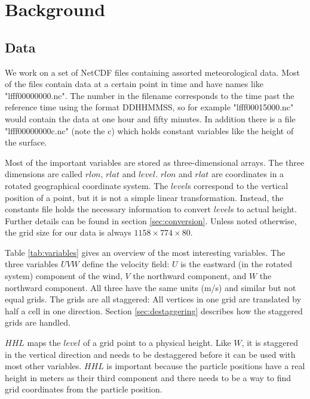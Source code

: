 \setcounter{chapter}{1}

\chapter{Background}
\section{Data}\label{sec:data}
We work on a set of NetCDF files containing assorted meteorological data. Most of the files contain data at a certain point in time and have names like "lfff00000000.nc". The number in the filename corresponds to the time past the reference time using the format DDHHMMSS, so for example "lfff00015000.nc" would contain the data at one hour and fifty minutes. In addition there is a file "lfff00000000c.nc" (note the c) which holds constant variables like the height of the surface.

Most of the important variables are stored as three-dimensional arrays. The three dimensions are called $rlon$, $rlat$ and $level$. $rlon$ and $rlat$ are coordinates in a rotated geographical coordinate system. The $level$s correspond to the vertical position of a point, but it is not a simple linear transformation. Instead, the constants file holds the necessary information to convert $level$s to actual height. Further details can be found in section \ref{sec:conversion}. Unless noted otherwise, the grid size for our data is always $1158 \times 774 \times 80$.

Table \ref{tab:variables} gives an overview of the most interesting variables. The three variables $UVW$ define the velocity field: $U$ is the eastward (in the rotated system) component of the wind, $V$ the northward component, and $W$ the northward component. All three have the same units (m/s) and similar but not equal grids. The grids are all staggered: All  vertices in one grid are translated by half a cell in one direction. Section \ref{sec:destaggering} describes how the staggered grids are handled.

$HHL$ maps the $level$ of a grid point to a physical height. Like $W$, it is staggered in the vertical direction and needs to be destaggered before it can be used with most other variables. $HHL$ is important because the particle positions have a real height in meters as their third component and there needs to be a way to find grid coordinates from the particle position.

